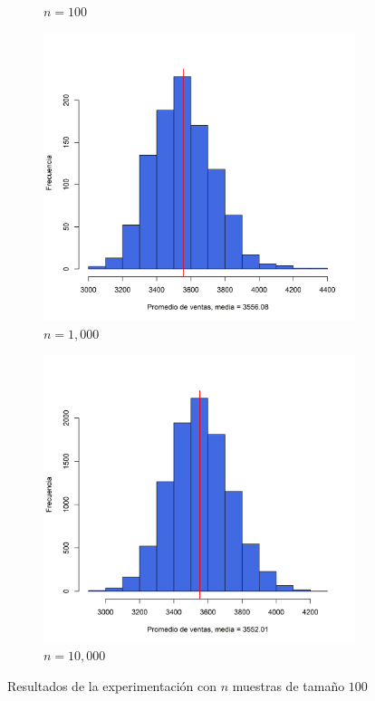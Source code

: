\documentclass{article}
\begin{document}
\begin{figure}[h]
\begin{center}
\begin{subfigure}[b]{0.45\textwidth}
        \caption{$n=100$}
    \end{subfigure}
        \begin{subfigure}[b]{0.5\textwidth}
        \includegraphics[scale=0.45]{Figures/1000-100.png}
        \caption{$n=1,000$}
    \end{subfigure}
    \begin{subfigure}[b]{0.45\textwidth}
        \includegraphics[scale=0.45]{Figures/10000-100.png}
        \caption{$n=10,000$}
    \end{subfigure}
    \caption{Resultados de la experimentación con $n$ muestras de tamaño $100$}
    \label{con100}
    \end{center}
\end{figure}



\end{document}
